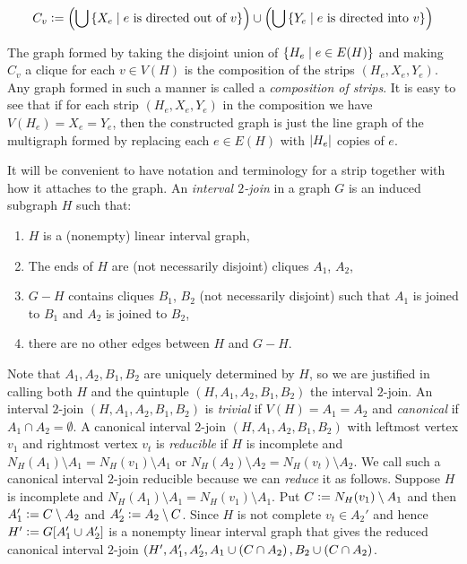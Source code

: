 \[C_v \mathrel{\mathop:}= \left( \bigcup \left\{ X_e \mid \text{$e$ is directed out of $v$} \right\} \right)
\cup \left( \bigcup \left\{ Y_e \mid \text{$e$ is directed into $v$} \right\} \right)\]

The graph formed by taking the disjoint union of $\left\{ H_e \mid e \in E(H) \right\}$ and
making $C_v$ a clique for each $v \in V(H)$ is the composition of the strips
$(H_e, X_e, Y_e)$.  Any graph formed in such a manner is called a
\emph{composition of strips}.  It is easy to see that if for
each strip $(H_e, X_e, Y_e)$ in the composition we have $V(H_e) = X_e = Y_e$,
then the constructed graph is just the line graph of the multigraph formed by
replacing each $e \in E(H)$ with $\left|H_e\right|$ copies of $e$.

It will be convenient to have notation and terminology for a strip together with
how it attaches to the graph. An \emph{interval $2$-join} in a graph $G$ is an
induced subgraph $H$ such that:
\begin{enumerate}
\item $H$ is a (nonempty) linear interval graph,
\item The ends of $H$ are (not necessarily disjoint) cliques $A_1$, $A_2$,
\item $G-H$ contains cliques $B_1$, $B_2$ (not necessarily disjoint) such that $A_1$ is joined to $B_1$ and $A_2$ is joined to $B_2$,
\item there are no other edges between $H$ and $G-H$.
\end{enumerate}

Note that $A_1, A_2, B_1, B_2$ are uniquely determined by $H$, so we
are justified in calling both $H$ and the quintuple $(H, A_1, A_2, B_1, B_2)$
the interval $2$-join. An interval $2$-join $(H, A_1, A_2, B_1, B_2)$ is
\emph{trivial} if $V(H) = A_1 = A_2$ and \emph{canonical} if $A_1 \cap A_2 =
\emptyset$.  A canonical interval $2$-join $(H, A_1, A_2, B_1, B_2)$ with
leftmost vertex $v_1$ and rightmost vertex $v_t$ is \emph{reducible} if $H$ is
incomplete and $N_H(A_1)\setminus A_1 = N_H(v_1)\setminus A_1$ or
$N_H(A_2)\setminus A_2 = N_H(v_t)\setminus A_2$.  We call such a canonical
interval $2$-join reducible because we can \emph{reduce} it as follows.  Suppose
$H$ is incomplete and $N_H(A_1)\setminus A_1 = N_H(v_1)\setminus A_1$. Put $C
\mathrel{\mathop:}= N_H(v_1) \setminus A_1$ and then $A_1' \mathrel{\mathop:}= C \setminus A_2$ and $A_2' \mathrel{\mathop:}= A_2 \setminus C$.  
Since $H$ is not complete $v_t \in A_2'$ and hence $H' \mathrel{\mathop:}= G[A_1' \cup
A_2']$ is a nonempty linear interval graph that gives the reduced canonical
interval $2$-join $(H', A_1', A_2', A_1 \cup \left( C \cap A_2 \right), B_2 \cup
\left( C \cap A_2 \right)$.

